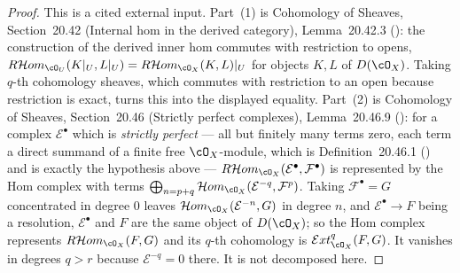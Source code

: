 \begin{proof}
This is a cited external input.  Part~(1) is Cohomology of Sheaves,
Section~20.42 (Internal hom in the derived category), Lemma~20.42.3
(): the construction of the derived inner hom commutes with
restriction to opens, $R\mathcal{H}om_{\cO_U}(K|_U,L|_U)
=R\mathcal{H}om_{\cO_X}(K,L)|_U$ for objects $K,L$ of $D(\cO_X)$.  Taking
$q$-th cohomology sheaves, which commutes with restriction to an open because
restriction is exact, turns this into the displayed equality.
Part~(2) is Cohomology of Sheaves, Section~20.46 (Strictly perfect complexes),
Lemma~20.46.9 (): for a complex $\mathcal E^\bullet$ which
is \emph{strictly perfect} --- all but finitely many terms zero, each term a
direct summand of a finite free $\cO_X$-module, which is Definition~20.46.1
() and is exactly the hypothesis above ---
$R\mathcal{H}om_{\cO_X}(\mathcal E^\bullet,\mathcal F^\bullet)$ is represented
by the Hom complex with terms
$\bigoplus_{n=p+q}\mathcal{H}om_{\cO_X}(\mathcal E^{-q},\mathcal F^{p})$.
Taking $\mathcal F^\bullet=G$ concentrated in degree $0$ leaves
$\mathcal{H}om_{\cO_X}(\mathcal E^{-n},G)$ in degree $n$, and
$\mathcal E^\bullet\to F$ being a resolution, $\mathcal E^\bullet$ and $F$ are
the same object of $D(\cO_X)$; so the Hom complex represents
$R\mathcal{H}om_{\cO_X}(F,G)$ and its $q$-th cohomology is
$\mathcal{E}xt^{q}_{\cO_X}(F,G)$.  It vanishes in degrees $q>r$ because
$\mathcal E^{-q}=0$ there.  It is not decomposed here.
\end{proof}

